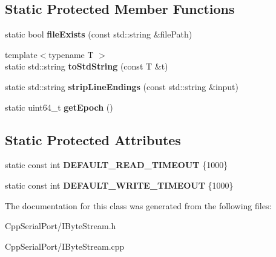 \subsection*{Static Protected Member Functions}
\begin{DoxyCompactItemize}
\item 
\mbox{\label{class_cpp_serial_port_1_1_i_byte_stream_a47145c37d2b9c4cd5d6c78bb63d398ce}} 
static bool {\bfseries file\+Exists} (const std\+::string \&file\+Path)
\item 
\mbox{\label{class_cpp_serial_port_1_1_i_byte_stream_a36a1dee6f8e03523b8766fd2cda5569e}} 
{\footnotesize template$<$typename T $>$ }\\static std\+::string {\bfseries to\+Std\+String} (const T \&t)
\item 
\mbox{\label{class_cpp_serial_port_1_1_i_byte_stream_a037ef7054280feff00160b0a7818e897}} 
static std\+::string {\bfseries strip\+Line\+Endings} (const std\+::string \&input)
\item 
\mbox{\label{class_cpp_serial_port_1_1_i_byte_stream_ab9b56a8ae6ee5e3d1bf100d91b0adc18}} 
static uint64\+\_\+t {\bfseries get\+Epoch} ()
\end{DoxyCompactItemize}
\subsection*{Static Protected Attributes}
\begin{DoxyCompactItemize}
\item 
\mbox{\label{class_cpp_serial_port_1_1_i_byte_stream_ae896f7775f1926653bb001f15c770b30}} 
static const int {\bfseries D\+E\+F\+A\+U\+L\+T\+\_\+\+R\+E\+A\+D\+\_\+\+T\+I\+M\+E\+O\+UT} \{1000\}
\item 
\mbox{\label{class_cpp_serial_port_1_1_i_byte_stream_a3d0ef76dc1ba015626384d3801b51b08}} 
static const int {\bfseries D\+E\+F\+A\+U\+L\+T\+\_\+\+W\+R\+I\+T\+E\+\_\+\+T\+I\+M\+E\+O\+UT} \{1000\}
\end{DoxyCompactItemize}


The documentation for this class was generated from the following files\+:\begin{DoxyCompactItemize}
\item 
Cpp\+Serial\+Port/I\+Byte\+Stream.\+h\item 
Cpp\+Serial\+Port/I\+Byte\+Stream.\+cpp\end{DoxyCompactItemize}
